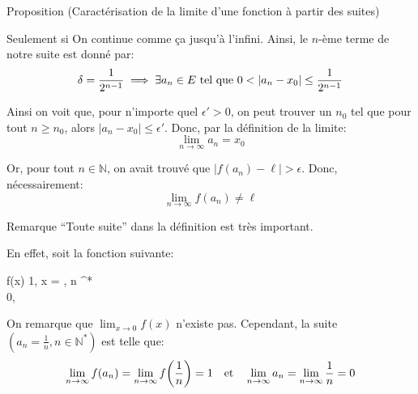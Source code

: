 \documentclass[a4paper]{article}
\begin{document}
\begin{parag}{Proposition (Caractérisation de la limite d'une fonction à partir des suites)}
\begin{subparag}{Seulement si}
            On continue comme ça jusqu'à l'infini. Ainsi, le $n$-ème terme de notre suite est donné par:
            \[\delta = \frac{1}{2^{n-1}} \implies \exists a_n \in E \telque 0 < \left|a_n - x_0\right| \leq \frac{1}{2^{n-1}}\]

            Ainsi on voit que, pour n'importe quel $\epsilon' > 0$, on peut trouver un $n_0$ tel que pour tout $n \geq n_0$, alors $\left|a_n - x_0\right| \leq \epsilon'$. Donc, par la définition de la limite:
            \[\lim_{n \to \infty} a_n = x_0\]

            Or, pour tout $n \in \mathbb{N}$, on avait trouvé que $\left|f\left(a_n\right) - \ell\right| > \epsilon$. Donc, nécessairement:
            \[\lim_{n \to \infty} f\left(a_n\right) \neq \ell\]

    \end{subparag}
\end{parag}

\begin{parag}{Remarque}
        ``Toute suite'' dans la définition est très important.

        En effet, soit la fonction suivante:
        \begin{functionbypart}{f\left(x\right)}
            1, \mathspace {} x = , n \in {}^* \\
            0, \mathspace {}
        \end{functionbypart}

        On remarque que $\lim_{x \to 0} f\left(x\right)$ n'existe pas. Cependant, la suite $\left(a_n = \frac{1}{n}, n \in \mathbb{N}^*\right)$ est telle que:
        \[\lim_{n \to \infty} f\left(a_n\right) = \lim_{n \to \infty} f\left(\frac{1}{n}\right) = 1 \mathspace \text{et} \mathspace \lim_{n \to \infty} a_n = \lim_{n \to \infty} \frac{1}{n} = 0\]
\end{parag}
\end{document}
